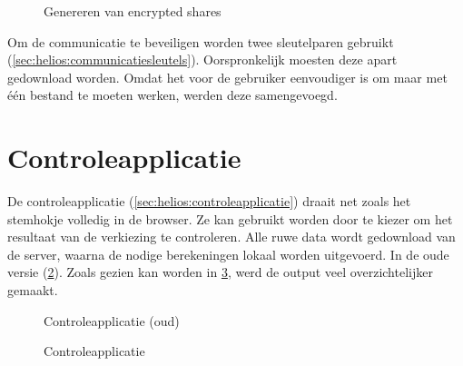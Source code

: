 \begin{figure}
  \caption{Genereren van encrypted shares}
  \label{fig:ui:trustees_home_encrypted_shares}
\end{figure}

\npar Om de communicatie te beveiligen worden twee sleutelparen gebruikt (\ref{sec:helios:communicatiesleutels}). Oorspronkelijk moesten deze apart gedownload worden. Omdat het voor de gebruiker eenvoudiger is om maar met \'e\'en bestand te moeten werken, werden deze samengevoegd.

\section{Controleapplicatie}
\label{sec:ui:controleapplicatie}

De controleapplicatie (\ref{sec:helios:controleapplicatie}) draait net zoals het stemhokje volledig in de browser. Ze kan gebruikt worden door te kiezer om het resultaat van de verkiezing te controleren. Alle ruwe data wordt gedownload van de server, waarna de nodige berekeningen lokaal worden uitgevoerd. In de oude versie (\ref{fig:ui:verifier_old}). Zoals gezien kan worden in \ref{fig:ui:verifier}, werd de output veel overzichtelijker gemaakt.

\begin{figure}
  \caption{Controleapplicatie (oud)}
  \label{fig:ui:verifier_old}
\end{figure}

\begin{figure}
  \caption{Controleapplicatie}
  \label{fig:ui:verifier}
\end{figure}

